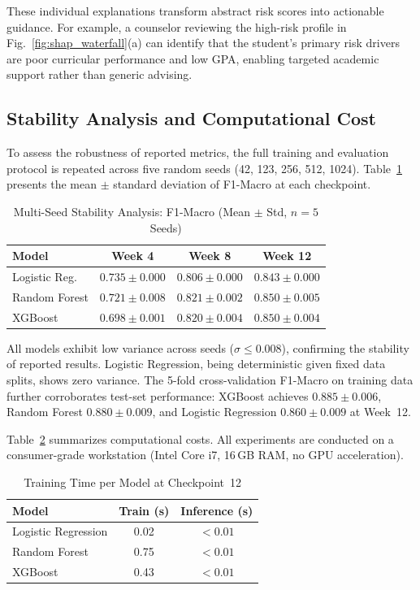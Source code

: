 \documentclass[conference,a4paper]{IEEEtran}
\begin{document}
These individual explanations transform abstract risk scores into actionable guidance. For example, a counselor reviewing the high-risk profile in Fig.~\ref{fig:shap_waterfall}(a) can identify that the student's primary risk drivers are poor curricular performance and low GPA, enabling targeted academic support rather than generic advising.

\subsection{Stability Analysis and Computational Cost}\label{sec:stability}

To assess the robustness of reported metrics, the full training and evaluation protocol is repeated across five random seeds (42, 123, 256, 512, 1024). Table~\ref{tab:stability} presents the mean $\pm$ standard deviation of F1-Macro at each checkpoint.

\begin{table}[htbp]
\centering
\caption{Multi-Seed Stability Analysis: F1-Macro (Mean $\pm$ Std, $n{=}5$ Seeds)}
\label{tab:stability}
\begin{tabular}{lccc}
\toprule
\textbf{Model} & \textbf{Week 4} & \textbf{Week 8} & \textbf{Week 12} \\
\midrule
Logistic Reg. & $0.735 \pm 0.000$ & $0.806 \pm 0.000$ & $0.843 \pm 0.000$ \\
Random Forest & $0.721 \pm 0.008$ & $0.821 \pm 0.002$ & $0.850 \pm 0.005$ \\
XGBoost       & $0.698 \pm 0.001$ & $0.820 \pm 0.004$ & $0.850 \pm 0.004$ \\
\bottomrule
\end{tabular}
\end{table}

All models exhibit low variance across seeds ($\sigma \leq 0.008$), confirming the stability of reported results. Logistic Regression, being deterministic given fixed data splits, shows zero variance. The 5-fold cross-validation F1-Macro on training data further corroborates test-set performance: XGBoost achieves $0.885 \pm 0.006$, Random Forest $0.880 \pm 0.009$, and Logistic Regression $0.860 \pm 0.009$ at Week~12.

Table~\ref{tab:compute} summarizes computational costs. All experiments are conducted on a consumer-grade workstation (Intel Core i7, 16\,GB RAM, no GPU acceleration).

\begin{table}[htbp]
\centering
\caption{Training Time per Model at Checkpoint~12}
\label{tab:compute}
\begin{tabular}{lcc}
\toprule
\textbf{Model} & \textbf{Train (s)} & \textbf{Inference (s)} \\
\midrule
Logistic Regression & 0.02 & $< 0.01$ \\
Random Forest & 0.75 & $< 0.01$ \\
XGBoost & 0.43 & $< 0.01$ \\
\bottomrule
\end{tabular}
\end{table}
\end{document}
